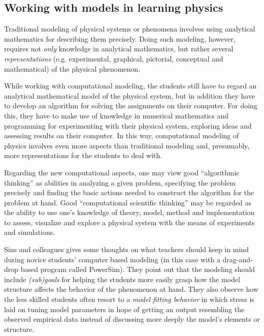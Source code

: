 \documentclass[aps,prb,floatfix,twocolumn,twoside,english]{revtex4-1}
\begin{document}
\subsection{Working with models in learning physics}

Traditional modeling of physical systems or phenomena involves using analytical mathematics for describing them precisely. Doing such modeling, however, requires not \textit{only} knowledge in analytical mathematics, but rather several \textit{representations} (e.g. experimental, graphical, pictorial, conceptual and mathematical) of the physical phenomenon.\cite{Angell:2008}

While working with computational modeling, the students still have to regard an analytical mathematical model of the physical system, but in addition they have to develop an algorithm for solving the assignments on their computer. For doing this, they have to make use of knowledge in numerical mathematics and programming for experimenting with their physical system, exploring ideas and assessing results on their computer. In this way, computational modeling of physics involves even more aspects than traditional modeling and, presumably, more representations for the students to deal with.

Regarding the new computational aspects, one may view good ``algorithmic thinking'' as abilities in analyzing a given problem, specifying the problem precisely and finding the basic actions needed to construct the algorithm for the problem at hand.\cite{Futschek:2006} Good ``computational scientific thinking'' may be regarded as the ability to use one's knowledge of theory, model, method and implementation to assess, visualize and explore a physical system with the means of experiments and simulations.\cite{Landau:2006}

Sins and colleagues gives some thoughts on what teachers should keep in mind during novice students' computer based modeling (in this case with a drag-and-drop based program called PowerSim).\cite{Sins:2005} They point out that the modeling should include \textit{(sub)goals} for helping the students more easily grasp how the model structure affects the behavior of the phenomenon at hand. They also observe how the less skilled students often resort to a \textit{model fitting behavior} in which stress is laid on tuning model parameters in hope of getting an output resembling the observed empirical data instead of discussing more deeply the model's elements or structure.
\end{document}
